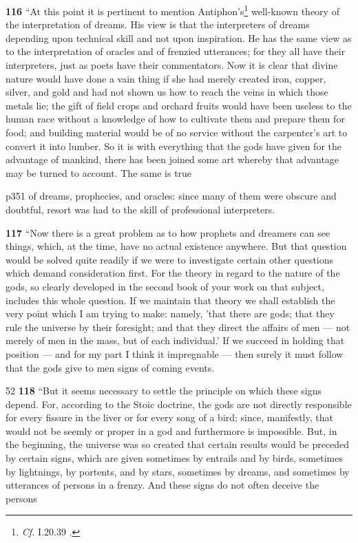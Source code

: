 \textbf{116} ``At this point it is pertinent to mention Antiphon's\texthebrew{}\footnote{\emph{Cf.} I.20.39 .

} well-known theory of the interpretation of dreams. His view is that the interpreters of dreams depending upon technical skill and not upon inspiration. He has the same view as to the interpretation of oracles and of frenzied utterances; for they all have their interpreters, just as poets have their commentators. Now it is clear that divine nature would have done a vain thing if she had merely created iron, copper, silver, and gold and had not shown us how to reach the veins in which those metals lie; the gift of field crops and orchard fruits would have been useless to the human race without a knowledge of how to cultivate them and prepare them for food; and building material would be of no service without the carpenter's art to convert it into lumber. So it is with everything that the gods have given for the advantage of mankind, there has been joined some art whereby that advantage may be turned to account. The same is true

p351 of dreams, prophecies, and oracles: since many of them were obscure and doubtful, resort was had to the skill of professional interpreters.

\textbf{117} ``Now there is a great problem as to how prophets and dreamers can see things, which, at the time, have no actual existence anywhere. But that question would be solved quite readily if we were to investigate certain other questions which demand consideration first. For the theory in regard to the nature of the gods, so clearly developed in the second book of your work on that subject, includes this whole question. If we maintain that theory we shall establish the very point which I am trying to make: namely, 'that there are gods; that they rule the universe by their foresight; and that they direct the affairs of men \texthebrew{—} not merely of men in the mass, but of each individual.' If we succeed in holding that position \texthebrew{—} and for my part I think it impregnable \texthebrew{—} then surely it must follow that the gods give to men signs of coming events.

52
\textbf{118} ``But it seems necessary to settle the principle on which these signs depend. For, according to the Stoic doctrine, the gods are not directly responsible for every fissure in the liver or for every song of a bird; since, manifestly, that would not be seemly or proper in a god and furthermore is impossible. But, in the beginning, the universe was so created that certain results would be preceded by certain signs, which are given sometimes by entrails and by birds, sometimes by lightnings, by portents, and by stars, sometimes by dreams, and sometimes by utterances of persons in a frenzy. And these signs do not often deceive the persons

